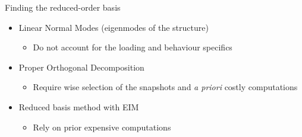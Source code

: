 \documentclass[aspectratio=1610]{beamer}
\begin{document}
\begin{frame}
\begin{orangeblockshadow}{\faCogs \quad Finding the reduced-order basis}
			\begin{itemize}
				\item Linear Normal Modes (eigenmodes of the structure) {\footnotesize{}}
				\begin{itemize}
					\item Do not account for the loading and behaviour specifics
				\end{itemize}
				\item Proper Orthogonal Decomposition {\footnotesize{}}
				\begin{itemize}
					\item Require wise selection of the snapshots and \emph{a priori} costly computations 
				\end{itemize}
				\item Reduced basis method {\footnotesize{}} with EIM {\footnotesize\citeperso{[Barrault et al., 2004]}}
				\begin{itemize}
					\item Rely on prior expensive computations
				\end{itemize}
			\end{itemize}
		\end{orangeblockshadow}
	\end{frame}
	
\end{document}
